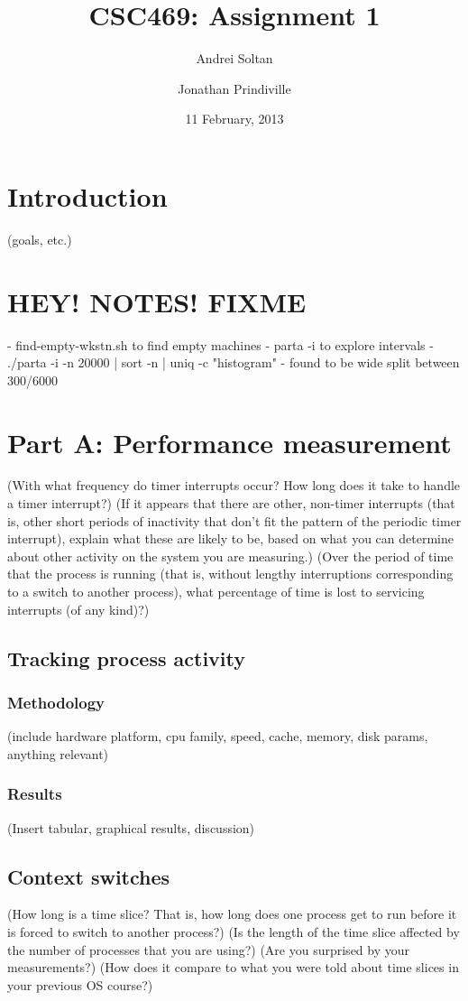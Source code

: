 \documentclass{article}
\author{Andrei Soltan \and Jonathan Prindiville}
\title{CSC469: Assignment 1}
\date{11 February, 2013}
\begin{document}
\maketitle

\tableofcontents

\newpage
\section{Introduction}
(goals, etc.)

\section{HEY! NOTES! FIXME}
- find-empty-wkstn.sh to find empty machines
- parta -i to explore intervals
  - ./parta -i -n 20000 | sort -n | uniq -c "histogram"
- found to be wide split between 300/6000

\newpage
\section{Part A: Performance measurement}
(With what frequency do timer interrupts occur? How long does it take to handle a timer interrupt?)
(If it appears that there are other, non-timer interrupts (that is, other short periods of inactivity that don't fit the pattern of the periodic timer interrupt), explain what these are likely to be, based on what you can determine about other activity on the system you are measuring.)
(Over the period of time that the process is running (that is, without lengthy interruptions corresponding to a switch to another process), what percentage of time is lost to servicing interrupts (of any kind)?)

\subsection{Tracking process activity}
\subsubsection{Methodology}
(include hardware platform, cpu family, speed, cache, memory, disk params, anything relevant)
\subsubsection{Results}
(Insert tabular, graphical results, discussion)

\subsection{Context switches}
(How long is a time slice? That is, how long does one process get to run before it is forced to switch to another process?)
(Is the length of the time slice affected by the number of processes that you are using?)
(Are you surprised by your measurements?)
(How does it compare to what you were told about time slices in your previous OS course?)
\end{document}
